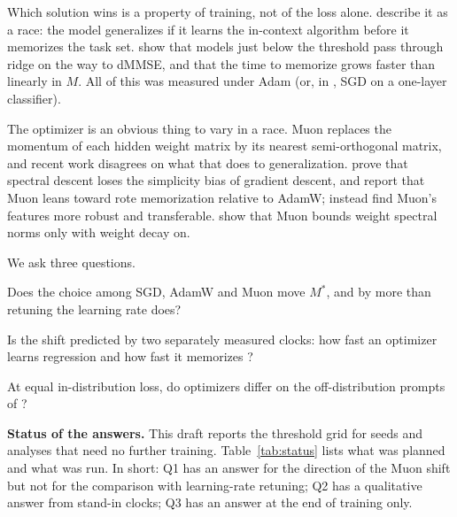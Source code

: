 \documentclass[11pt]{article}
\newcommand{\Mstar}{M^{*}}
\begin{document}
Which solution wins is a property of training, not of the loss alone. \citet{nguyen2025} describe it as a race: the model generalizes if it learns the in-context algorithm before it memorizes the task set. \citet{carroll2025} show that models just below the threshold pass through ridge on the way to dMMSE, and \citet{wurgaft2025} that the time to memorize grows faster than linearly in $M$. All of this was measured under Adam (or, in \citet{nguyen2025}, SGD on a one-layer classifier).

The optimizer is an obvious thing to vary in a race. Muon \citep{jordan2024} replaces the momentum of each hidden weight matrix by its nearest semi-orthogonal matrix, and recent work disagrees on what that does to generalization. \citet{dragutinovic2026} prove that spectral descent loses the simplicity bias of gradient descent, and \citet{liu2026} report that Muon leans toward rote memorization relative to AdamW; \citet{ruan2026} instead find Muon's features more robust and transferable. \citet{chen2026} show that Muon bounds weight spectral norms only with weight decay on.

We ask three questions.
\begin{description}\setlength{\itemsep}{0pt}
\item[Q1.] Does the choice among SGD, AdamW and Muon move $\Mstar$, and by more than retuning the learning rate does?
\item[Q2.] Is the shift predicted by two separately measured clocks: how fast an optimizer learns regression and how fast it memorizes \citep{nguyen2025}?
\item[Q3.] At equal in-distribution loss, do optimizers differ on the off-distribution prompts of \citet{garg2022}?
\end{description}

\textbf{Status of the answers.} This draft reports the threshold grid for \NSeeds{} seeds and analyses that need no further training. Table~\ref{tab:status} lists what was planned and what was run. In short: Q1 has an answer for the direction of the Muon shift but not for the comparison with learning-rate retuning; Q2 has a qualitative answer from stand-in clocks; Q3 has an answer at the end of training only.
\end{document}
